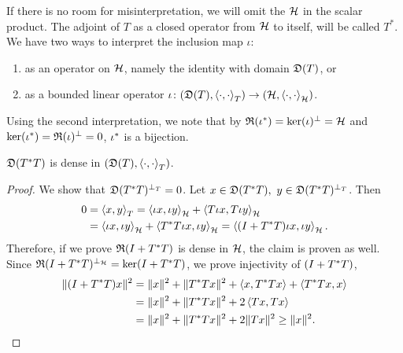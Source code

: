 If there is no room for misinterpretation,
we will omit the $\mathcal{H}$ in the scalar product. The adjoint of $T$ as a closed 
operator from $\mathcal{H}$ to itself, will be called $T^*$. 
We have two ways to interpret the inclusion map $\iota$:
\begin{enumerate}
 \item as an operator on $\mathcal{H}$, namely the identity with domain $\mathfrak{D}(T)$, or
 \item as a bounded linear operator $\iota \colon ( \mathfrak{D}(T) , \left\langle \cdot, \cdot \right\rangle_T)
 \to ( \mathcal{H} , \left\langle \cdot, \cdot \right\rangle_{\mathcal{H}})$.
\end{enumerate}
Using the second interpretation, we note that by 
$\mathfrak{R}(\iota^{*}) = \ker(\iota)^\perp =\mathcal{H}$
and $\ker(\iota^{*}) = \mathfrak{R}(\iota)^\perp = 0$, $\iota^{*}$ is a bijection.
\begin{lem}\label{TTstrDense}
 $\mathfrak{D}(T^{*} T)$ is dense in $( \mathfrak{D}(T) , \left\langle \cdot, \cdot \right\rangle_T)$.
\end{lem}
\begin{proof}
 We show that $\mathfrak{D}(T ^{*} T)^{\perp_T} = 0$. Let $x \in \mathfrak{D}(T ^{*} T), 
 ~y \in \mathfrak{D}(T ^{*} T)^{\perp_T}$. Then
 \begin{align*}
  0 &=\left\langle x, y \right\rangle_T = \left\langle \iota x, \iota y \right\rangle_{\mathcal{H}} + \left\langle T\iota x, T\iota y \right\rangle
  _{\mathcal{H}} \\
  &=\left\langle \iota x, \iota y \right\rangle_{\mathcal{H}} + \left\langle T^{*} T\iota x, \iota y \right\rangle_{\mathcal{H}}
= \left\langle (I + T ^{*} T) \iota x, \iota y \right\rangle_{\mathcal{H}}.
 \end{align*}
Therefore, if we prove $\mathfrak{R}(I + T^{*} T)$ is dense in $\mathcal{H}$, the claim is
proven as well. Since $\mathfrak{R}(I + T^{*} T)^{\perp_{\mathcal{H}}} = \ker(I + T^{*} T)$, we prove
injectivity of $(I + T^{*} T)$,
\begin{align*}
 \| (I + T^{*} T)x \| ^2  
 &= \|x \| ^2 + \| T ^{*} T x\| ^2 + \left\langle x, T^{*} T x \right\rangle
 + \left\langle T ^{*} T x, x \right\rangle\\
 &=\|x \| ^2 + \| T ^{*} T x\| ^2 + 2\left\langle Tx,  T x \right\rangle \\
 &= \|x \| ^2 + \| T ^{*} T x\| ^2 + 2\|T x\|^2 \geq \|x\|^2.
\end{align*}

\end{proof}


